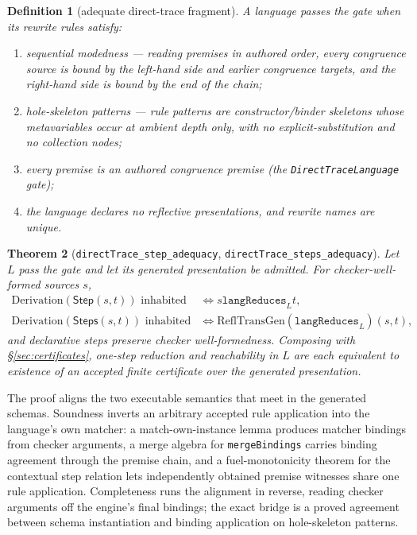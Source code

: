 \documentclass[]{article}
\newtheorem{theorem}{Theorem}
\newtheorem{definition}[theorem]{Definition}
\theoremstyle{remark}
\newcommand{\code}[1]{\texttt{#1}}
\begin{document}
\begin{definition}[adequate direct-trace fragment]
A language passes the gate when its rewrite rules satisfy:
\begin{enumerate}
\item \emph{sequential modedness} --- reading premises in authored order,
  every congruence source is bound by the left-hand side and earlier
  congruence targets, and the right-hand side is bound by the end of the
  chain;
\item \emph{hole-skeleton patterns} --- rule patterns are
  constructor/binder skeletons whose metavariables occur at ambient depth
  only, with no explicit-substitution and no collection nodes;
\item every premise is an authored congruence premise
  (the \code{DirectTraceLanguage} gate);
\item the language declares no reflective presentations, and rewrite names
  are unique.
\end{enumerate}
\end{definition}

\begin{theorem}[\code{directTrace\_step\_adequacy},
    \code{directTrace\_steps\_adequacy}]
Let $L$ pass the gate and let its generated presentation be admitted.  For
checker-well-formed sources $s$,
\begin{align*}
  \mathrm{Derivation}(\mathsf{Step}(s,t)) \text{ inhabited}
    &\iff s \mathrel{\code{langReduces}_L} t,\\
  \mathrm{Derivation}(\mathsf{Steps}(s,t)) \text{ inhabited}
    &\iff \mathrm{ReflTransGen}(\code{langReduces}_L)(s,t),
\end{align*}
and declarative steps preserve checker well-formedness.  Composing with
\S\ref{sec:certificates}, one-step reduction and reachability in $L$ are
each equivalent to existence of an accepted finite certificate over the
generated presentation.
\end{theorem}

The proof aligns the two executable semantics that meet in the generated
schemas.  Soundness inverts an arbitrary accepted rule application into the
language's own matcher: a match-own-instance lemma produces matcher
bindings from checker arguments, a merge algebra for \code{mergeBindings}
carries binding agreement through the premise chain, and a fuel-monotonicity
theorem for the contextual step relation lets independently obtained premise
witnesses share one rule application.  Completeness runs the alignment in
reverse, reading checker arguments off the engine's final bindings; the
exact bridge is a proved agreement between schema instantiation and binding
application on hole-skeleton patterns.
\end{document}
